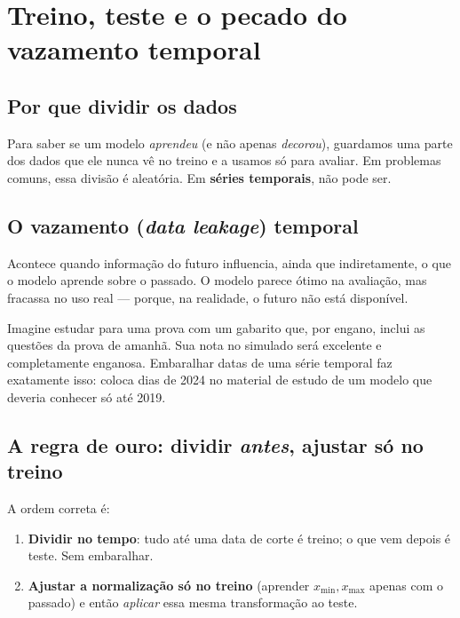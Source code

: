 \section{Treino, teste e o pecado do vazamento temporal}
\label{sec:vazamento}

\subsection{Por que dividir os dados}
Para saber se um modelo \emph{aprendeu} (e não apenas \emph{decorou}), guardamos
uma parte dos dados que ele nunca vê no treino e a usamos só para avaliar. Em
problemas comuns, essa divisão é aleatória. Em \textbf{séries temporais}, não
pode ser.

\subsection{O vazamento (\emph{data leakage}) temporal}
\begin{definicao}
Acontece quando informação do futuro influencia, ainda que indiretamente, o que
o modelo aprende sobre o passado. O modelo parece ótimo na avaliação, mas
fracassa no uso real --- porque, na realidade, o futuro não está disponível.
\end{definicao}

\begin{intuicao}
Imagine estudar para uma prova com um gabarito que, por engano, inclui as
questões da prova de amanhã. Sua nota no simulado será excelente e completamente
enganosa. Embaralhar datas de uma série temporal faz exatamente isso: coloca
dias de 2024 no material de estudo de um modelo que deveria conhecer só até 2019.
\end{intuicao}

\subsection{A regra de ouro: dividir \emph{antes}, ajustar só no treino}
A ordem correta é:
\begin{enumerate}[noitemsep]
  \item \textbf{Dividir no tempo}: tudo até uma data de corte é treino; o que
        vem depois é teste. Sem embaralhar.
  \item \textbf{Ajustar a normalização só no treino} (aprender $x_{\min},x_{\max}$
        apenas com o passado) e então \emph{aplicar} essa mesma transformação ao
        teste.
\end{enumerate}

